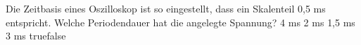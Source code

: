     {Die Zeitbasis eines Oszilloskop ist so eingestellt, dass ein Skalenteil 0,5 ms entspricht. Welche Periodendauer hat die angelegte Spannung?}
    {4 ms}
    {2 ms}
    {1,5 ms}
    {3 ms}
    {true}{false}